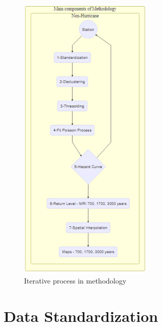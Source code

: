 \documentclass[12pt,oneside]{reedthesis}
\begin{document}
\begin{figure}

{\centering \includegraphics[width=2.5in]{figure/main_methodology} 

}

\caption{Iterative process in methodology}\label{fig:mainmethodology}
\end{figure}
\hypertarget{rmd-standartization}{%
\section{Data Standardization}\label{rmd-standartization}}
\end{document}
